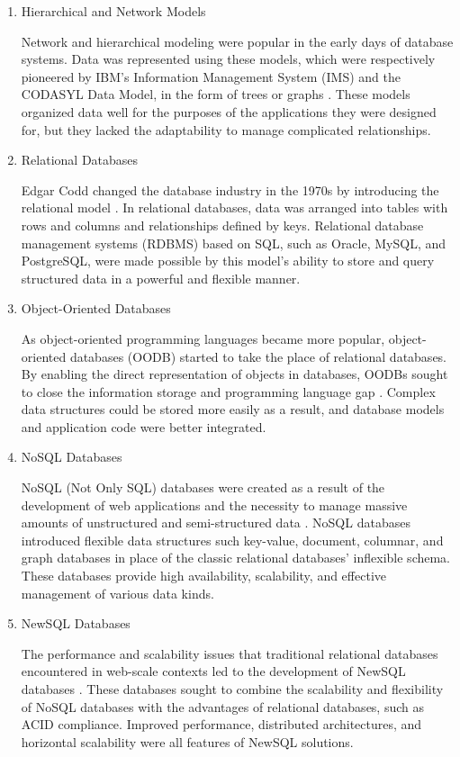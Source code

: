 \begin{enumerate}
\item Hierarchical and Network Models
\par Network and hierarchical modeling were popular in the early days of database systems. Data was represented using these models, which were respectively pioneered by IBM's Information Management System (IMS) and the CODASYL Data Model, in the form of trees or graphs \cite{Date2003}. These models organized data well for the purposes of the applications they were designed for, but they lacked the adaptability to manage complicated relationships.

\item Relational Databases
\par Edgar Codd changed the database industry in the 1970s by introducing the relational model \cite{Codd1970}. In relational databases, data was arranged into tables with rows and columns and relationships defined by keys. Relational database management systems (RDBMS) based on SQL, such as Oracle, MySQL, and PostgreSQL, were made possible by this model's ability to store and query structured data in a powerful and flexible manner.

\item Object-Oriented Databases
\par As object-oriented programming languages became more popular, object-oriented databases (OODB) started to take the place of relational databases. By enabling the direct representation of objects in databases, OODBs sought to close the information storage and programming language gap \cite{Unland1990}. Complex data structures could be stored more easily as a result, and database models and application code were better integrated.

\item NoSQL Databases
\par NoSQL (Not Only SQL) databases were created as a result of the development of web applications and the necessity to manage massive amounts of unstructured and semi-structured data \cite{Hai2011}. NoSQL databases introduced flexible data structures such key-value, document, columnar, and graph databases in place of the classic relational databases' inflexible schema. These databases provide high availability, scalability, and effective management of various data kinds.

\item NewSQL Databases
\par The performance and scalability issues that traditional relational databases encountered in web-scale contexts led to the development of NewSQL databases \cite{Aslett2011}. These databases sought to combine the scalability and flexibility of NoSQL databases with the advantages of relational databases, such as ACID compliance. Improved performance, distributed architectures, and horizontal scalability were all features of NewSQL solutions.
\end{enumerate}

